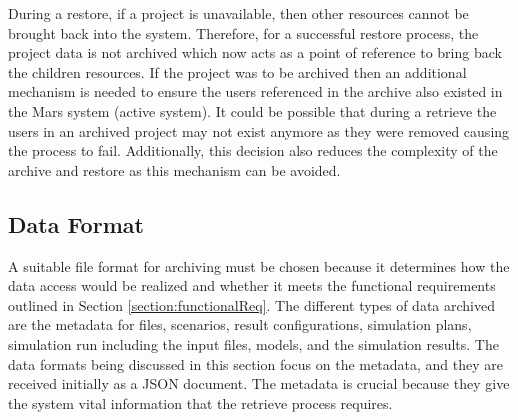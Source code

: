 During a restore, if a project
is unavailable, then other resources cannot be brought back into the system. Therefore, for a successful restore process,
the project data is not archived which now acts as a point of reference to bring back the children resources. 
If the project was to be archived then an additional mechanism is needed to ensure the users referenced in the archive also existed in the Mars system (active system).
It could be possible that during a retrieve the users in an
archived project may not exist anymore as they were removed causing the process to fail. Additionally, this decision also reduces the complexity of the 
archive and restore as this mechanism can be avoided.


\subsection{Data Format}
A suitable file format for archiving must be chosen because it determines how the data access would be realized and whether it meets
the functional requirements outlined in Section \ref{section:functionalReq}. The different types of data archived are the metadata for files, scenarios, 
result configurations, simulation plans, simulation run including the input files, models, and the simulation results. 
The data formats being discussed in this section focus on the metadata, and they are received initially as a JSON document.
The metadata is crucial because they give the system vital information that the retrieve process requires. 

